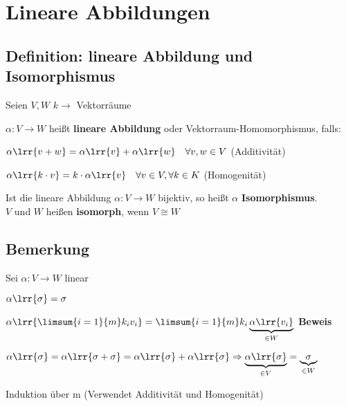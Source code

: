 \newpage
\section{Lineare Abbildungen}

\subsection{Definition: lineare Abbildung und Isomorphismus}
	Seien $V,W$ $k\rightarrow$ Vektorräume
		\item $\alpha:V\rightarrow W$ heißt \textbf{lineare Abbildung} oder Vektorraum-Homomorphismus, falls:
				\item $\alpha\lrr{v+w}=\alpha\lrr{v}+\alpha\lrr{w}\quad\forall v,w\in V$ (Additivität)
				\item $\alpha\lrr{k\cdot v}=k\cdot\alpha\lrr{v}\quad\forall v\in V,\forall k\in K$ (Homogenität)
			\subExEnd
		\item Ist die lineare Abbildung $\alpha: V\rightarrow W$ bijektiv, so heißt $\alpha$ \textbf{Isomorphismus}.\\
			$V$ und $W$ heißen \textbf{isomorph}, wenn $V\cong W$
	\subExEnd

\subsection{Bemerkung}
	Sei $\alpha:V\rightarrow W$ linear
		\item $\alpha\lrr{\sigma}=\sigma$
		\item $\alpha\lrr{\limsum{i=1}{m}k_iv_i}=\limsum{i=1}{m}k_i\underbrace{\alpha\lrr{v_i}}_{\scriptstyle \in W}$
	\subExEnd
	\textbf{Beweis}
		\item $\alpha\lrr{\sigma}=\alpha\lrr{\sigma+\sigma}=\alpha\lrr{\sigma}+\alpha\lrr{\sigma}\Rightarrow\underbrace{\alpha\lrr{\sigma}}_{\scriptstyle \in V}=\underbrace{\sigma}_{\scriptstyle \in W}$
		\item Induktion über m (Verwendet Additivität und Homogenität)
	\subExEnd


